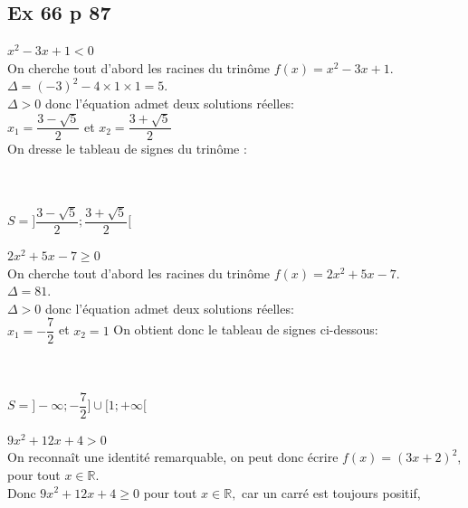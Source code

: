 \documentclass[12pt,a4paper]{book}
\begin{document}
\subsection*{Ex 66 p 87}
\begin{enumMet}
    \item $x^{2}-3 x+1<0$\\
    On cherche tout d'abord les racines du trinôme $f(x)=x^{2}-3 x+1$. \\
    $\Delta=(-3)^{2}-4 \times 1 \times 1=5$.\\
    $\Delta>0$ donc l'équation admet deux solutions réelles:\\
    $x_{1}=\dfrac{3-\sqrt{5}}{2}$ et $x_{2}=\dfrac{3+\sqrt{5}}{2}$\\
    On dresse le tableau de signes du trinôme : \\
    \\
    \ \\
    $S=\bigg] \dfrac{3-\sqrt{5}}{2} ; \dfrac{3+\sqrt{5}}{2}\bigg[$
    \item $2 x^{2}+5 x-7 \geqslant 0$\\
    On cherche tout d'abord les racines du trinôme $f(x)=2 x^{2}+5 x-7$.\\
    $\Delta=81$. \\
    $\Delta>0$ donc l'équation admet deux solutions réelles:\\
    $x_{1}=-\dfrac{7}{2}$ et $x_{2}=1$
    On obtient donc le tableau de signes ci-dessous:\\
    \\
    \ \\
    $S=\bigg]-\infty ;-\dfrac{7}{2}\bigg] \cup\bigg[1 ;+\infty\bigg[$
    \item $9 x^{2}+12 x+4>0$\\
    On reconnaît une identité remarquable, on peut donc écrire $f(x)=(3 x+2)^{2}$, pour tout $x \in \mathbb{R}$.\\
    Donc $9 x^{2}+12 x+4 \geq 0$ pour tout $x \in \mathbb{R},$ car
    un carré est toujours positif, \\

\end{enumMet}
\end{document}
